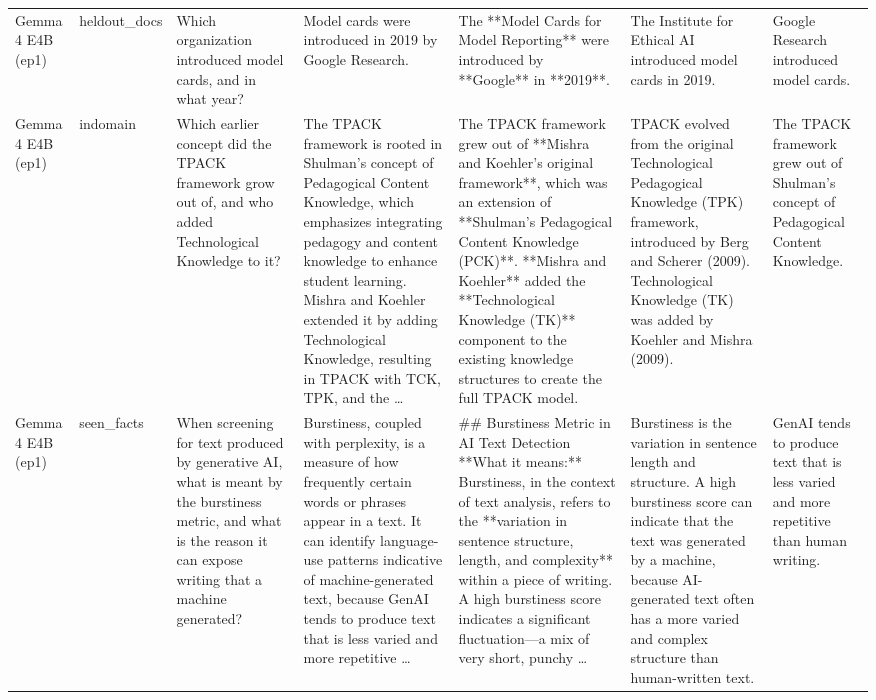 \begin{table}[t]
\begin{tabular}{p{1.6cm}p{1cm}p{2.4cm}p{2.6cm}p{3.2cm}p{3.2cm}p{2.4cm}}
Gemma 4 E4B (ep1) & heldout\_docs & Which organization introduced model cards, and in what year? & Model cards were introduced in 2019 by Google Research. & The **Model Cards for Model Reporting** were introduced by **Google** in **2019**. & The Institute for Ethical AI introduced model cards in 2019. & Google Research introduced model cards. \\
Gemma 4 E4B (ep1) & indomain & Which earlier concept did the TPACK framework grow out of, and who added Technological Knowledge to it? & The TPACK framework is rooted in Shulman's concept of Pedagogical Content Knowledge, which emphasizes integrating pedagogy and content knowledge to enhance student learning. Mishra and Koehler extended it by adding Technological Knowledge, resulting in TPACK with TCK, TPK, and the … & The TPACK framework grew out of **Mishra and Koehler's original framework**, which was an extension of **Shulman's Pedagogical Content Knowledge (PCK)**. **Mishra and Koehler** added the **Technological Knowledge (TK)** component to the existing knowledge structures to create the full TPACK model. & TPACK evolved from the original Technological Pedagogical Knowledge (TPK) framework, introduced by Berg and Scherer (2009). Technological Knowledge (TK) was added by Koehler and Mishra (2009). & The TPACK framework grew out of Shulman's concept of Pedagogical Content Knowledge. \\
Gemma 4 E4B (ep1) & seen\_facts & When screening for text produced by generative AI, what is meant by the burstiness metric, and what is the reason it can expose writing that a machine generated? & Burstiness, coupled with perplexity, is a measure of how frequently certain words or phrases appear in a text. It can identify language-use patterns indicative of machine-generated text, because GenAI tends to produce text that is less varied and more repetitive … & \#\# Burstiness Metric in AI Text Detection **What it means:** Burstiness, in the context of text analysis, refers to the **variation in sentence structure, length, and complexity** within a piece of writing. A high burstiness score indicates a significant fluctuation—a mix of very short, punchy … & Burstiness is the variation in sentence length and structure. A high burstiness score can indicate that the text was generated by a machine, because AI-generated text often has a more varied and complex structure than human-written text. & GenAI tends to produce text that is less varied and more repetitive than human writing. \\

\end{tabular}
\end{table}
